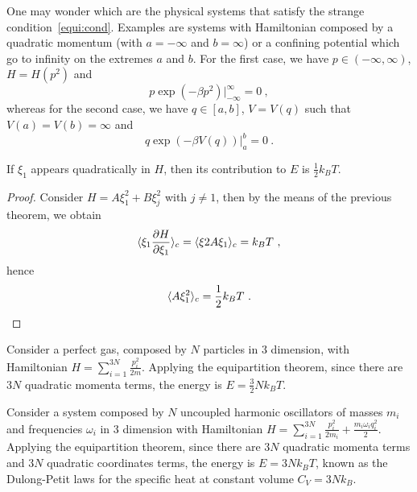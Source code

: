     One may wonder which are the physical systems that satisfy the strange condition~\eqref{equi:cond}. Examples are systems with Hamiltonian composed by a quadratic momentum (with $a = -\infty$ and $b = \infty$) or a confining potential which go to infinity on the extremes $a$ and $b$. For the first case, we have $p \in (-\infty, \infty)$, $H = H(p^2)$ and
    \begin{equation*}
        p \exp(-\beta p^2) \Big \vert_{-\infty}^\infty = 0 ~,
    \end{equation*}
    whereas for the second case, we have $q \in [a, b]$, $V = V(q)$ such that $V(a) = V(b) = \infty$ and 
    \begin{equation*}
        q \exp(-\beta V(q)) \Big \vert_a^b = 0 ~.
    \end{equation*}

    \begin{corollary}
        If $\xi_1$ appears quadratically in $H$, then its contribution to $E$ is $\frac{1}{2} k_B T$.
    \end{corollary}

    \begin{proof}
        Consider $H = A \xi_1^2 + B \xi_j^2$ with $j \neq 1$, then by the means of the previous theorem, we obtain 
        \begin{equation*}
            \langle\xi_1 \frac{\partial H}{\partial\xi_1}\rangle_{c} = \langle\xi 2 A \xi_1\rangle_{c} = k_B T ~,
        \end{equation*}
        hence
        \begin{equation*}
            \langle A \xi_1^2\rangle_{c} = \frac{1}{2} k_B T ~.
        \end{equation*}
    \end{proof}

    \begin{example}
        Consider a perfect gas, composed by $N$ particles in $3$ dimension, with Hamiltonian $H = \sum_{i=1}^{3N} \frac{p_i^2}{2m}$. Applying the equipartition theorem, since there are $3N$ quadratic momenta terms, the energy is $E = \frac{3}{2} N k_B T$.
    \end{example}
    \begin{example}
        Consider a system composed by $N$ uncoupled harmonic oscillators of masses $m_i$ and frequencies $\omega_i$ in $3$ dimension with Hamiltonian $H = \sum_{i=1}^{3N} \frac{p_i^2}{2m_i} + \frac{m_i \omega_i q_i^2}{2}$. Applying the equipartition theorem, since there are $3N$ quadratic momenta terms and $3N$ quadratic coordinates terms, the energy is $E = 3 N k_B T$, known as the Dulong-Petit laws for the specific heat at constant volume $C_V = 3 N k_B$.
    \end{example}


